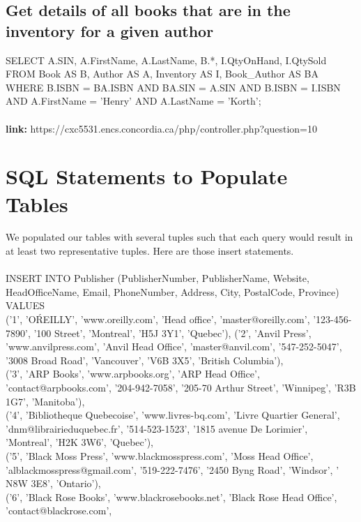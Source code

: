 \documentclass{scrreprt}
\begin{document}
\section{Get details of all books that are in the inventory for a given author}
SELECT A.SIN, A.FirstName, A.LastName, B.*, I.QtyOnHand, I.QtySold\\
            FROM Book AS B, Author AS A, Inventory AS I, Book_Author AS BA\\
            WHERE B.ISBN = BA.ISBN
            AND BA.SIN = A.SIN
            AND B.ISBN = I.ISBN
            AND A.FirstName = 'Henry' AND A.LastName = 'Korth';  
\\\\\textbf{link:} https://cxc5531.encs.concordia.ca/php/controller.php?question=10

\chapter{SQL Statements to Populate Tables}
We populated our tables with several tuples such that each query would result in at least two representative tuples. Here are those insert statements.\\\\
INSERT INTO Publisher (PublisherNumber, PublisherName, Website, HeadOfficeName, Email,
                       PhoneNumber, Address, City, PostalCode, Province)\\
VALUES\\ ('1', 'O\'REILLY', 'www.oreilly.com', 'Head office', 'master@oreilly.com',
        '123-456-7890', '100 Street', 'Montreal', 'H5J 3Y1', 'Quebec'),
       ('2', 'Anvil Press', 'www.anvilpress.com', 'Anvil Head Office', 'master@anvil.com', '547-252-5047',
         '3008 Broad Road', 'Vancouver', 'V6B 3X5', 'British Columbia'),\\
       ('3', 'ARP Books', 'www.arpbooks.org', 'ARP Head Office', 'contact@arpbooks.com', '204-942-7058', '205-70 Arthur Street',
        'Winnipeg', 'R3B 1G7', 'Manitoba'),\\
       ('4', 'Bibliotheque Quebecoise', 'www.livres-bq.com', 'Livre Quartier General', 'dnm@librairieduquebec.fr',
        '514-523-1523', '1815 avenue De Lorimier', 'Montreal', 'H2K 3W6', 'Quebec'),\\
       ('5', 'Black Moss Press', 'www.blackmosspress.com', 'Moss Head Office', 'alblackmosspress@gmail.com',
        '519-222-7476', '2450 Byng Road', 'Windsor', ' N8W 3E8', 'Ontario'),\\
       ('6', 'Black Rose Books', 'www.blackrosebooks.net', 'Black Rose Head Office', 'contact@blackrose.com',
\end{document}
